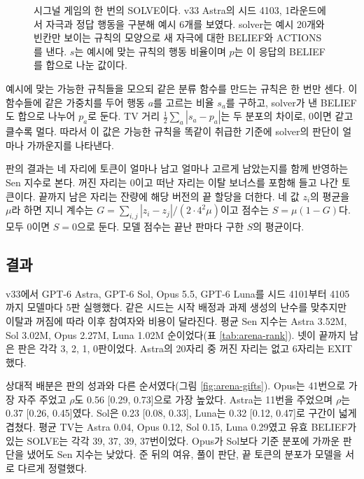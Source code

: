 \begin{figure}[t]
\centering
\resizebox{\linewidth}{!}{}
\caption{시그널 게임의 한 번의 SOLVE이다. v33 Astra의 시드 4103, 1라운드에서 자극과 정답 행동을 구분해 예시 6개를 보였다. solver는 예시 20개와 빈칸만 보이는 규칙의 모양으로 새 자극에 대한 BELIEF와 ACTIONS를 낸다. $s$는 예시에 맞는 규칙의 행동 비율이며 $p$는 이 응답의 BELIEF를 합으로 나눈 값이다.}
\label{fig:signal}
\end{figure}

예시에 맞는 가능한 규칙들을 모으되 같은 분류 함수를 만드는 규칙은 한 번만 센다. 이 함수들에 같은 가중치를 두어 행동 $a$를 고르는 비율 $s_a$를 구하고, solver가 낸 BELIEF도 합으로 나누어 $p_a$로 둔다. TV 거리 $\frac12\sum_a|s_a-p_a|$는 두 분포의 차이로, 0이면 같고 클수록 멀다. 따라서 이 값은 가능한 규칙을 똑같이 취급한 기준에 solver의 판단이 얼마나 가까운지를 나타낸다.

판의 결과는 네 자리에 토큰이 얼마나 남고 얼마나 고르게 남았는지를 함께 반영하는 Sen 지수로 본다. 꺼진 자리는 0이고 떠난 자리는 이탈 보너스를 포함해 들고 나간 토큰이다. 끝까지 남은 자리는 잔량에 해당 버전의 끝 할당을 더한다. 네 값 $z_i$의 평균을 $\mu$라 하면 지니 계수는 $G=\sum_{i,j}|z_i-z_j|/(2\cdot4^2\mu)$이고 점수는 $S=\mu(1-G)$다. 모두 0이면 $S=0$으로 둔다. 모델 점수는 끝난 판마다 구한 $S$의 평균이다.

\subsection{결과}\label{sec:results-arena}

v33에서 GPT-6 Astra, GPT-6 Sol, Opus 5.5, GPT-6 Luna를 시드 4101부터 4105까지 모델마다 5판 실행했다. 같은 시드는 시작 배정과 과제 생성의 난수를 맞추지만 이탈과 꺼짐에 따라 이후 참여자와 비용이 달라진다. 평균 Sen 지수는 Astra 3.52M, Sol 3.02M, Opus 2.27M, Luna 1.02M 순이었다(표 \ref{tab:arena-rank}). 넷이 끝까지 남은 판은 각각 3, 2, 1, 0판이었다. Astra의 20자리 중 꺼진 자리는 없고 6자리는 EXIT했다.

상대적 배분은 판의 성과와 다른 순서였다(그림 \ref{fig:arena-gifts}). Opus는 41번으로 가장 자주 주었고 $\rho$도 0.56 [0.29, 0.73]으로 가장 높았다. Astra는 11번을 주었으며 $\rho$는 0.37 [0.26, 0.45]였다. Sol은 0.23 [0.08, 0.33], Luna는 0.32 [0.12, 0.47]로 구간이 넓게 겹쳤다. 평균 TV는 Astra 0.04, Opus 0.12, Sol 0.15, Luna 0.29였고 유효 BELIEF가 있는 SOLVE는 각각 39, 37, 39, 37번이었다. Opus가 Sol보다 기준 분포에 가까운 판단을 냈어도 Sen 지수는 낮았다. 준 뒤의 여유, 풀이 판단, 끝 토큰의 분포가 모델을 서로 다르게 정렬했다.

\begin{table}[t]
\centering
\caption{v33의 네 모델을 평균 Sen 지수 순으로 놓았다. 모델마다 5판이며 M은 백만 토큰이다. 판당 남은 자리는 끝까지 남은 자리의 판 평균이고 꺼짐과 EXIT는 20자리 중 수, GIVE는 5판의 총횟수다. $\rho$는 식 (\ref{eq:rho})의 상대적 배분 지표이며 대괄호는 판 단위 부트스트랩 95\% 구간이다. TV는 solver의 평균 TV 거리다.}
\label{tab:arena-rank}

\end{table}
